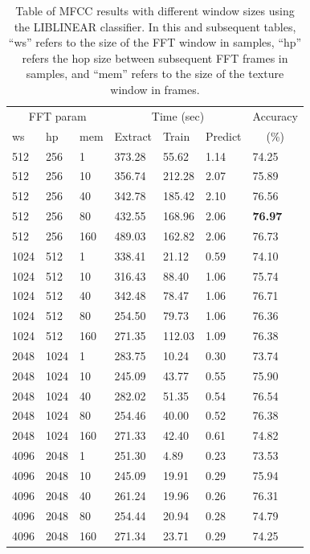 \documentclass[12pt,oneside]{book}
\begin{document}
\begin{table}
\begin{tabular}{|l|l|l|l|l|l|l|}
\hline
\multicolumn{3}{|c|}{FFT param} & \multicolumn{3}{c|}{Time (sec)} & Accuracy \\
\hhline{|-|-|-|-|-|-|~|}
ws & hp & mem & Extract & Train & Predict & \multicolumn{1}{c|}{(\%)} \\
\hhline{|=|=|=|=|=|=|=|}
512   &  256   &  1    &    373.28  &   55.62  &  1.14  &  74.25  \\
512   &  256   &  10   &    356.74  &  212.28  &  2.07  &  75.89  \\
512   &  256   &  40   &    342.78  &  185.42  &  2.10  &  76.56  \\
512   &  256   &  80   &    432.55  &  168.96  &  2.06  &  \textbf{76.97}  \\
512   &  256   &  160  &    489.03  &  162.82  &  2.06  &  76.73  \\
\hline
1024  &  512   &  1    &    338.41  &   21.12  &  0.59  &  74.10  \\
1024  &  512   &  10   &    316.43  &   88.40  &  1.06  &  75.74  \\
1024  &  512   &  40   &    342.48  &   78.47  &  1.06  &  76.71  \\
1024  &  512   &  80   &    254.50  &   79.73  &  1.06  &  76.36  \\
1024  &  512   &  160  &    271.35  &  112.03  &  1.09  &  76.38  \\
\hline
2048  &  1024  &  1    &    283.75  &   10.24  &  0.30  &  73.74  \\
2048  &  1024  &  10   &    245.09  &   43.77  &  0.55  &  75.90  \\
2048  &  1024  &  40   &    282.02  &   51.35  &  0.54  &  76.54  \\
2048  &  1024  &  80   &    254.46  &   40.00  &  0.52  &  76.38  \\
2048  &  1024  &  160  &    271.33  &   42.40  &  0.61  &  74.82  \\
\hline
4096  &  2048  &  1    &    251.30  &    4.89  &  0.23  &  73.53  \\
4096  &  2048  &  10   &    245.09  &   19.91  &  0.29  &  75.94  \\
4096  &  2048  &  40   &    261.24  &   19.96  &  0.26  &  76.31  \\
4096  &  2048  &  80   &    254.44  &   20.94  &  0.28  &  74.79  \\
4096  &  2048  &  160  &    271.34  &   23.71  &  0.29  &  74.25  \\
\hline
\end{tabular}
\caption{Table of MFCC results with different window sizes using the
  LIBLINEAR classifier.  In this and subsequent tables, ``ws'' refers
  to the size of the FFT window in samples, ``hp'' refers the hop size
  between subsequent FFT frames in samples, and ``mem'' refers to the
  size of the texture window in frames.}
\label{table:obv-fft}
\end{table}
\end{document}
